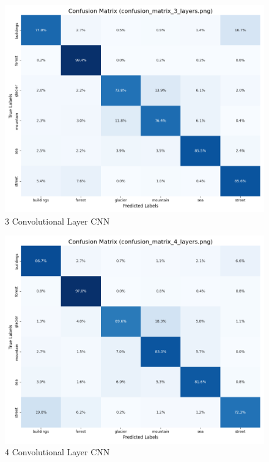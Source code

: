 \documentclass[conference]{IEEEtran}
\begin{document}
\begin{figure}[ht]
    \centering
    \includegraphics[width=\linewidth]{img/confusion_matrix_3_layers.png}
    \caption{3 Convolutional Layer CNN}
    \label{fig:sub3}
\end{figure}

\begin{figure}[ht]
    \centering
    \includegraphics[width=\linewidth]{img/confusion_matrix_4_layers.png}
    \caption{4 Convolutional Layer CNN}
    \label{fig:sub4}
\end{figure}
\end{document}
